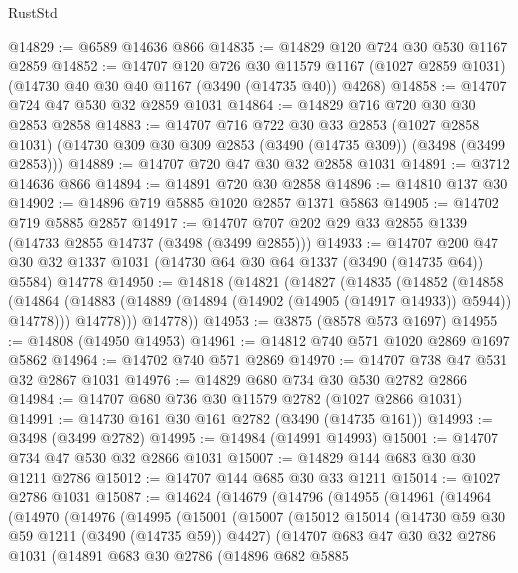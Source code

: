 \begin{lexlean}{RustStd}
\begin{coremodule}
@14829 := @6589 @14636 @866
@14835 := @14829 @120 @724 @30 @530 @1167 @2859
@14852 := @14707
    @120
    @726
    @30
    @11579
    @1167
    (@1027 @2859 @1031)
    (@14730 @40 @30 @40 @1167 (@3490 (@14735 @40)) @4268)
@14858 := @14707 @724 @47 @530 @32 @2859 @1031
@14864 := @14829 @716 @720 @30 @30 @2853 @2858
@14883 := @14707
    @716
    @722
    @30
    @33
    @2853
    (@1027 @2858 @1031)
    (@14730 @309 @30 @309 @2853 (@3490 (@14735 @309)) (@3498 (@3499 @2853)))
@14889 := @14707 @720 @47 @30 @32 @2858 @1031
@14891 := @3712 @14636 @866
@14894 := @14891 @720 @30 @2858
@14896 := @14810 @137 @30
@14902 := @14896 @719 @5885 @1020 @2857 @1371 @5863
@14905 := @14702 @719 @5885 @2857
@14917 := @14707 @707 @202 @29 @33 @2855 @1339 (@14733 @2855 @14737 (@3498 (@3499 @2855)))
@14933 := @14707
    @200
    @47
    @30
    @32
    @1337
    @1031
    (@14730 @64 @30 @64 @1337 (@3490 (@14735 @64)) @5584)
    @14778
@14950 := @14818
    (@14821
      (@14827
        (@14835
          (@14852
            (@14858
              (@14864 (@14883 (@14889 (@14894 (@14902 (@14905 (@14917 @14933)) @5944)) @14778)))
              @14778)))
        @14778))
@14953 := @3875 (@8578 @573 @1697)
@14955 := @14808 (@14950 @14953)
@14961 := @14812 @740 @571 @1020 @2869 @1697 @5862
@14964 := @14702 @740 @571 @2869
@14970 := @14707 @738 @47 @531 @32 @2867 @1031
@14976 := @14829 @680 @734 @30 @530 @2782 @2866
@14984 := @14707 @680 @736 @30 @11579 @2782 (@1027 @2866 @1031)
@14991 := @14730 @161 @30 @161 @2782 (@3490 (@14735 @161))
@14993 := @3498 (@3499 @2782)
@14995 := @14984 (@14991 @14993)
@15001 := @14707 @734 @47 @530 @32 @2866 @1031
@15007 := @14829 @144 @683 @30 @30 @1211 @2786
@15012 := @14707 @144 @685 @30 @33 @1211
@15014 := @1027 @2786 @1031
@15087 := @14624
    (@14679
      (@14796
        (@14955
          (@14961
            (@14964
              (@14970
                (@14976
                  (@14995
                    (@15001
                      (@15007
                        (@15012
                          @15014
                          (@14730 @59 @30 @59 @1211 (@3490 (@14735 @59)) @4427)
                          (@14707
                            @683
                            @47
                            @30
                            @32
                            @2786
                            @1031
                            (@14891
                              @683
                              @30
                              @2786
                              (@14896
                                @682
                                @5885

\end{coremodule}
\end{lexlean}
